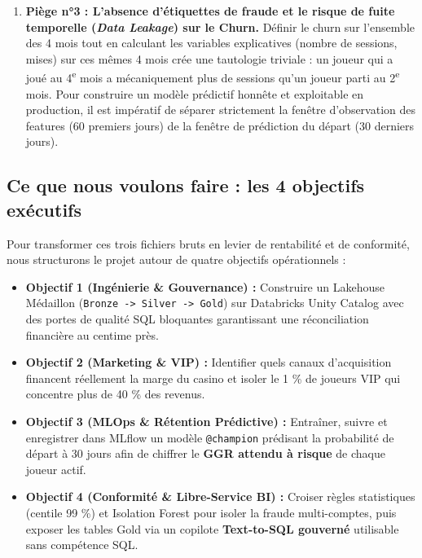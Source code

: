 \documentclass[11pt,a4paper]{article}
\begin{document}
\begin{enumerate}
    \item \textbf{Piège n°3 : L'absence d'étiquettes de fraude et le risque de fuite temporelle (\textit{Data Leakage}) sur le Churn.} Définir le churn sur l'ensemble des 4 mois tout en calculant les variables explicatives (nombre de sessions, mises) sur ces mêmes 4 mois crée une tautologie triviale : un joueur qui a joué au 4\textsuperscript{e} mois a mécaniquement plus de sessions qu'un joueur parti au 2\textsuperscript{e} mois. Pour construire un modèle prédictif honnête et exploitable en production, il est impératif de séparer strictement la fenêtre d'observation des features (60 premiers jours) de la fenêtre de prédiction du départ (30 derniers jours).
\end{enumerate}

\subsection{Ce que nous voulons faire : les 4 objectifs exécutifs}
Pour transformer ces trois fichiers bruts en levier de rentabilité et de conformité, nous structurons le projet autour de quatre objectifs opérationnels :
\begin{itemize}
    \item \textbf{Objectif 1 (Ingénierie \& Gouvernance) :} Construire un Lakehouse Médaillon (\texttt{Bronze -> Silver -> Gold}) sur Databricks Unity Catalog avec des portes de qualité SQL bloquantes garantissant une réconciliation financière au centime près.
    \item \textbf{Objectif 2 (Marketing \& VIP) :} Identifier quels canaux d'acquisition financent réellement la marge du casino et isoler le 1 \% de joueurs VIP qui concentre plus de 40 \% des revenus.
    \item \textbf{Objectif 3 (MLOps \& Rétention Prédictive) :} Entraîner, suivre et enregistrer dans MLflow un modèle \texttt{@champion} prédisant la probabilité de départ à 30 jours afin de chiffrer le \textbf{GGR attendu à risque} de chaque joueur actif.
    \item \textbf{Objectif 4 (Conformité \& Libre-Service BI) :} Croiser règles statistiques (centile 99 \%) et Isolation Forest pour isoler la fraude multi-comptes, puis exposer les tables Gold via un copilote \textbf{Text-to-SQL gouverné} utilisable sans compétence SQL.
\end{itemize}

\newpage
\end{document}
